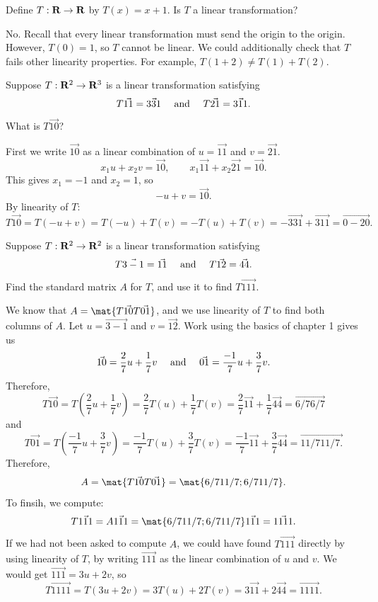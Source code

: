 \begin{problems}
%
\problem %
Define $T: {\bf R} \to {\bf R}$ by $T(x) = x+1$.  Is $T$ a linear transformation?

\begin{solution}
No.  Recall that every linear transformation must send the origin to the origin.  However, $T(0) = 1$, so $T$ cannot be linear.  We could additionally check that $T$ fails other linearity properties.  For example, $T(1 + 2) \neq T(1) + T(2)$.
\end{solution}

\problem %
Suppose $T: {\bf R}^2 \to {\bf R}^3$ is a linear transformation satisfying
\[T\vec{1 1} = \vec{3 3 1} \quad \textup{ and } \quad T \vec{2 1} = \vec{3 1 1}.\]
What is $T \vec{1 0}$?

\begin{solution}
First we write $\vec{1 0}$ as a linear combination of $u = \vec{1 1}$ and $v = \vec{2 1}$.
\[x_1 u + x_2 v = \vec{1 0}, \qquad x_1 \vec{1 1} + x_2 \vec{2 1} = \vec{1 0}.\]
This gives $x_1 = -1$ and $x_2 = 1$, so 
\[-u + v= \vec{1 0}.\]
By linearity of $T$:
\[T\vec{1 0} = T(-u+v) = T(-u)+T(v) = -T(u)+T(v)
= -\vec{3 3 1} + \vec{3 1 1} = \vec{0 -2 0}.\]
\end{solution}

\problem 
Suppose $T: {\bf R}^2 \to {\bf R}^2$ is a linear transformation satisfying
\[T\vec{3 -1} = \vec{1 1} \quad \textup{ and } \quad T \vec{1 2} = \vec{4 4}.\]
Find the standard matrix $A$ for $T$, and use it to find $T\vec{11 1}$.

\begin{solution}
  We know that $A = \mat{T\vec{1 0} T\vec{0 1}}$, and we use linearity of $T$ to
  find both columns of $A$.  Let $u = \vec{3 -1}$ and $v = \vec{1 2}$.  Work
  using the basics of chapter 1 gives us
\[\vec{1 0} = \dfrac{2}{7} u + \dfrac{1}{7} v \quad
\textup{ and } \quad 
\vec{0 1} = \dfrac{-1}{7} u + \dfrac{3}{7} v.
\]
Therefore, 
\[T \vec{1 0} = T\left(\dfrac{2}{7}u + \dfrac{1}{7} v\right)
= \dfrac{2}{7} T(u) + \dfrac{1}{7} T(v) 
= \dfrac{2}{7} \vec{1 1} + \dfrac{1}{7} \vec{4 4}
= \vec{6/7 6/7}\]
and
\[T \vec{0 1} = T\left(\dfrac{-1}{7}u + \dfrac{3}{7} v\right)
= \dfrac{-1}{7} T(u) + \dfrac{3}{7} T(v) 
= \dfrac{-1}{7} \vec{1 1} + \dfrac{3}{7} \vec{4 4}
= \vec{11/7 11/7.}\]
Therefore, 
\[A = \mat{T\vec{1 0} T\vec{0 1}} = \mat{6/7 11/7; 6/7 11/7}.\]
To finsih, we compute:
\[T\vec{11 1} = A \vec{11 1} = 
\mat{6/7 11/7; 6/7 11/7} \vec{11 1} = \vec{11 11}.\]
If we had not been asked to compute $A$, we could have found $T\vec{11 1}$ directly by using linearity of $T$, by writing $\vec{11 1}$ as the linear combination of $u$ and $v$.  We would get
$\vec{11 1} = 3u + 2v$, so 
\[T\vec{11 11} = T(3u+2v) = 3T(u)+2T(v) = 3 \vec{1 1} + 2 \vec{4 4}
= \vec{11 11}.\]
\end{solution}




\end{problems}
